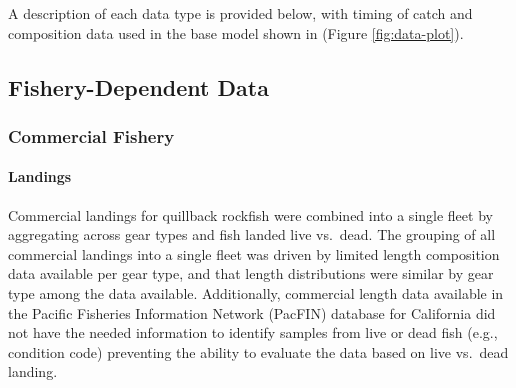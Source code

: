 \documentclass[11pt,
  english,
  a4paper,
]{article}
\begin{document}
A description of each data type is provided below, with timing of catch and composition data used in the base model shown in (Figure \ref{fig:data-plot}).

\leavevmode\tagmcend\tagstructend\par


\hypertarget{fishery-dependent-data}{%
\subsection{Fishery-Dependent Data}\label{fishery-dependent-data}}

\leavevmode\tagmcend\tagstructend


\hypertarget{commercial-fishery}{%
\subsubsection{Commercial Fishery}\label{commercial-fishery}}

\leavevmode\tagmcend\tagstructend


\hypertarget{landings}{%
\paragraph{Landings}\label{landings}}

\leavevmode\tagmcend\tagstructend


Commercial landings for quillback rockfish were combined into a single fleet by aggregating across gear types and fish landed live vs.~dead. The grouping of all commercial landings into a single fleet was driven by limited length composition data available per gear type, and that length distributions were similar by gear type among the data available. Additionally, commercial length data available in the Pacific Fisheries Information Network (PacFIN) database for California did not have the needed information to identify samples from live or dead fish (e.g., condition code) preventing the ability to evaluate the data based on live vs.~dead landing.

\leavevmode\tagmcend\tagstructend\par

\end{document}
